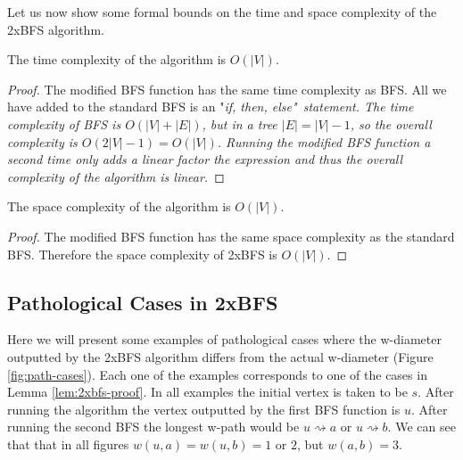 Let us now show some formal bounds on the time and space complexity of the 2xBFS algorithm.

\begin{lem} The time complexity of the algorithm is $O(|V|)$. \end{lem}

\begin{proof}
    The modified BFS function has the same time complexity as BFS. All we have added to the standard BFS is an "\em if, then, else\em"~statement. The time complexity of BFS is $O(|V| + |E|)$, but in a tree $|E| = |V| - 1$, so the overall complexity is $O(2|V| - 1) = O(|V|)$.
    Running the modified BFS function a second time only adds a linear factor the expression and thus the overall complexity of the algorithm is linear.
\end{proof}

\begin{lem} The space complexity of the algorithm is $O(|V|)$. \end{lem}

\begin{proof}
    The modified BFS function has the same space complexity as the standard BFS. Therefore the space complexity of 2xBFS is $O(|V|)$.
\end{proof}

\subsection{Pathological Cases in 2xBFS}

Here we will present some examples of pathological cases where the w-diameter outputted by the 2xBFS algorithm differs from the actual w-diameter (Figure \ref{fig:path-cases}). Each one of the examples corresponds to one of the cases in Lemma \ref{lem:2xbfs-proof}. In all examples the initial vertex is taken to be $s$. After running the algorithm the vertex outputted by the first BFS function is $u$. After running the second BFS the longest w-path would be $u \rightsquigarrow a$ or $u \rightsquigarrow b$. We can see that that in all figures $w(u, a) = w(u, b) = 1 \text{ or } 2$, but $w(a, b) = 3$.


